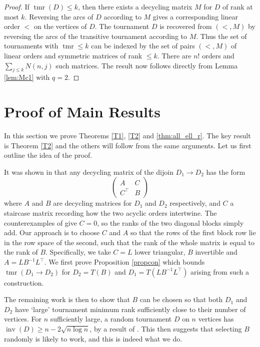 \documentclass[a4paper, 12pt, reqno]{amsart}
\numberwithin{equation}{section}
\theoremstyle{plain}
\theoremstyle{remark}
\theoremstyle{definition}
\newcommand{\tmr}{\operatorname{tmr}}
\newcommand{\inv}{\operatorname{inv}}
\begin{document}
 \begin{proof}
     If $\tmr(D) \leq k$, then there exists a decycling matrix $M$ for $D$ of rank at most $k$. Reversing the arcs of $D$ according to $M$ gives a corresponding  linear order $<$ on the vertices of $D$. The tournament $D$ is recovered from $(<,M)$ by reversing the arcs of the transitive tournament according to $M$. Thus the set of tournaments with $\tmr \leq k$ can be indexed by the set of pairs $(<,M)$ of linear orders and symmetric matrices of rank $ \leq k$. There are $n!$ orders and $\sum_{j \leq k} N(n,j)$ such matrices. The result now follows directly from Lemma \ref{lem:Mc1} with $q = 2$.
 \end{proof}

 
\section{Proof of Main Results}\label{sec:main}

In this section we prove Theorems \ref{T1}, \ref{T2} and \ref{thm:all_ell_r}. The key result is Theorem  \ref{T2} and the others will follow from the same arguments. Let us first outline the idea of the proof.


It was shown in \cite{natcase} that any decycling matrix of the dijoin $D_1 \to D_2$ has the form
\begin{equation*}
\begin{pmatrix}
    A &C\\ C^{\top} & B
\end{pmatrix}
\end{equation*}
where $A$ and $B$ are decycling matrices for $D_1$ and $D_2$ respectively, and $C$ a staircase matrix recording how the two acyclic orders intertwine. The counterexamples of \cite{Alon,Problems} give  $C=0$, so the ranks of the two diagonal blocks simply add. Our approach is to choose $C$ and $A$ so that the rows of the first block row lie in the row space of the second, such that the rank of the whole matrix is equal to the rank of $B$. Specifically, we take $C=L$ lower triangular, $B$ invertible and $A = L B^{-1}L^{\top}$. 
We first prove Proposition \ref{propcon} which bounds $\tmr(D_1 \rightarrow D_2)$ for $D_2 = T(B)$ and $D_1 = T(LB^{-1}L^{\top})$ arising from such a construction.


The remaining work is then to show that $B$ can be chosen so that both $D_1$ and $D_2$ have `large' tournament minimum rank sufficiently close to their number of vertices.  For $n$ sufficiently large, a random tournament $D$ on $n$ vertices has $\inv(D) \ge n - 2\sqrt{n\log{n}}$, by a result of \cite[Theorem 1.5]{Problems}. This then suggests that selecting $B$ randomly is likely to work, and this is indeed what we do.
\end{document}
